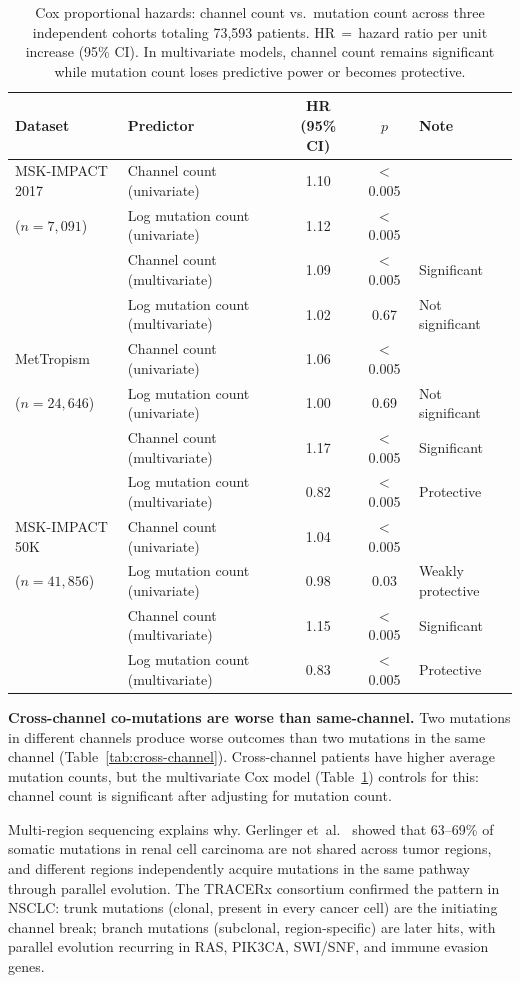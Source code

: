 \documentclass[11pt]{article}
\begin{document}
\begin{table}[ht]
\centering
\caption{Cox proportional hazards: channel count vs.\ mutation
count across three independent cohorts totaling 73{,}593 patients.
HR\,$=$\,hazard ratio per unit increase (95\% CI).
In multivariate models,
channel count remains significant while mutation count loses
predictive power or becomes protective.}
\label{tab:empirical}
\medskip
\begin{tabular*}{\textwidth}{@{\extracolsep{\fill}}llccl@{}}
\toprule
Dataset & Predictor & HR (95\% CI) & $p$ & Note \\
\midrule
MSK-IMPACT 2017 & Channel count (univariate) & 1.10 & $<$0.005 & \\
\quad ($n=7{,}091$) & Log mutation count (univariate) & 1.12 & $<$0.005 & \\
 & Channel count (multivariate) & 1.09 & $<$0.005 & Significant \\
 & Log mutation count (multivariate) & 1.02 & 0.67 & Not significant \\
\midrule
MetTropism & Channel count (univariate) & 1.06 & $<$0.005 & \\
\quad ($n=24{,}646$) & Log mutation count (univariate) & 1.00 & 0.69 & Not significant \\
 & Channel count (multivariate) & 1.17 & $<$0.005 & Significant \\
 & Log mutation count (multivariate) & 0.82 & $<$0.005 & Protective \\
\midrule
MSK-IMPACT 50K & Channel count (univariate) & 1.04 & $<$0.005 & \\
\quad ($n=41{,}856$) & Log mutation count (univariate) & 0.98 & 0.03 & Weakly protective \\
 & Channel count (multivariate) & 1.15 & $<$0.005 & Significant \\
 & Log mutation count (multivariate) & 0.83 & $<$0.005 & Protective \\
\bottomrule
\end{tabular*}
\end{table}

\textbf{Cross-channel co-mutations are worse than same-channel.}
Two mutations in different channels produce worse outcomes than
two mutations in the same channel (Table~\ref{tab:cross-channel}).
Cross-channel patients have higher average mutation counts, but the
multivariate Cox model (Table~\ref{tab:empirical}) controls for
this: channel count is significant after adjusting for mutation
count.

Multi-region sequencing explains why. Gerlinger et~al.\
\cite{Gerlinger2012} showed that 63--69\% of somatic mutations in
renal cell carcinoma are not shared across tumor regions, and
different regions independently acquire mutations in the same
pathway through parallel evolution. The TRACERx consortium
\cite{JamalHanjani2017, Swanton2023} confirmed the pattern in
NSCLC: trunk mutations (clonal, present in every cancer cell) are
the initiating channel break; branch mutations (subclonal,
region-specific) are later hits, with parallel evolution recurring
in RAS, PIK3CA, SWI/SNF, and immune evasion genes.
\end{document}
